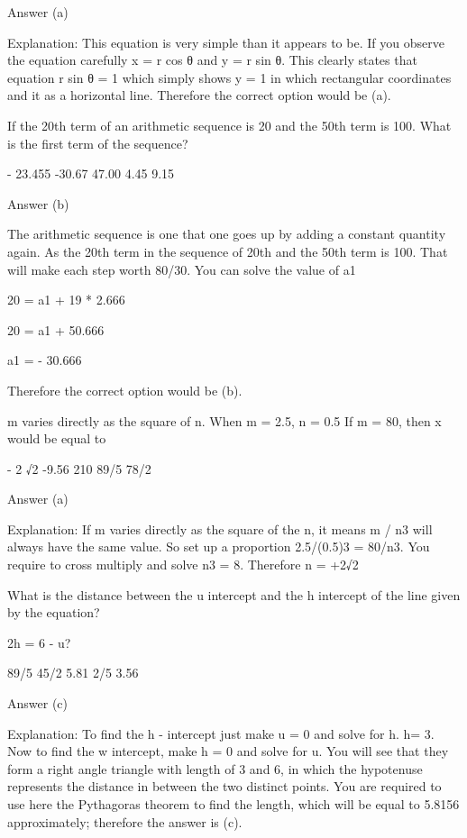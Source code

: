     Answer (a)

    Explanation: This equation is very simple than it appears to be. If you observe the equation carefully x = r cos θ and y = r sin θ. This clearly states that equation r sin θ = 1 which simply shows y = 1 in which rectangular coordinates and it as a horizontal line. Therefore the correct option would be (a).

    If the 20th term of an arithmetic sequence is 20 and the 50th term is 100. What is the first term of the sequence?

        - 23.455
        -30.67
        47.00
        4.45
        9.15 

    Answer (b)

    The arithmetic sequence is one that one goes up by adding a constant quantity again. As the 20th term in the sequence of 20th and the 50th term is 100. That will make each step worth 80/30. You can solve the value of a1

    20 = a1 + 19 * 2.666

    20 = a1 + 50.666

    a1 = - 30.666

    Therefore the correct option would be (b).

    m varies directly as the square of n. When m = 2.5, n = 0.5 If m = 80, then x would be equal to

        - 2 √2
        -9.56
        210
        89/5
        78/2 

    Answer (a)

    Explanation: If m varies directly as the square of the n, it means m / n3 will always have the same value. So set up a proportion 2.5/(0.5)3 = 80/n3. You require to cross multiply and solve n3 = 8. Therefore n = +2√2

    What is the distance between the u intercept and the h intercept of the line given by the equation?

    2h = 6 - u?

        89/5
        45/2
        5.81
        2/5
        3.56 

    Answer (c)

    Explanation: To find the h - intercept just make u = 0 and solve for h. h= 3. Now to find the w intercept, make h = 0 and solve for u. You will see that they form a right angle triangle with length of 3 and 6, in which the hypotenuse represents the distance in between the two distinct points. You are required to use here the Pythagoras theorem to find the length, which will be equal to 5.8156 approximately; therefore the answer is (c).

